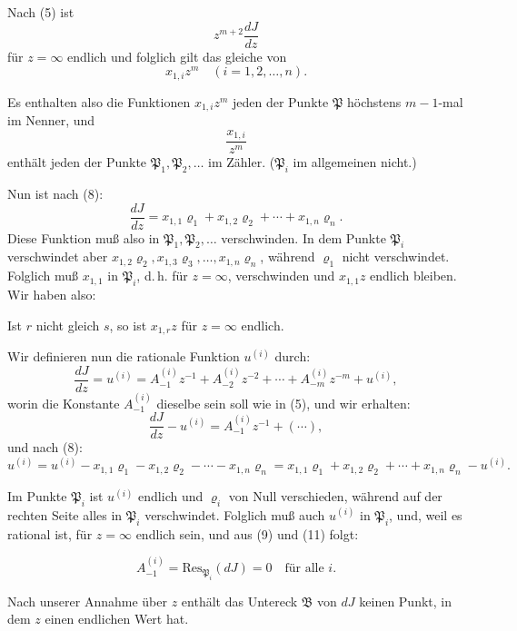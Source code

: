 \documentclass[12pt,a4paper]{article}
\begin{document}
Nach (5) ist
\[
z^{m+2} \frac{dJ}{dz}
\]
für $z = \infty$ endlich und folglich gilt das gleiche von
\begin{equation}\label{eq:201-10}
x_{1,i} z^m \quad (i = 1, 2, \ldots, n).
\end{equation}

Es enthalten also die Funktionen $x_{1,i} z^m$ jeden der Punkte $\mathfrak{P}$ höchstens $m-1$-mal im Nenner, und
\[
\frac{x_{1,i}}{z^m}
\]
enthält jeden der Punkte $\mathfrak{P}_1, \mathfrak{P}_2, \ldots$ im Zähler. ($\mathfrak{P}_i$ im allgemeinen nicht.)

Nun ist nach (8):
\[
\frac{dJ}{dz} = x_{1,1} \varrho_1 + x_{1,2} \varrho_2 + \cdots + x_{1,n} \varrho_n.
\]
Diese Funktion muß also in $\mathfrak{P}_1, \mathfrak{P}_2, \ldots$ verschwinden. In dem Punkte $\mathfrak{P}_i$ verschwindet aber $x_{1,2} \varrho_2, x_{1,3} \varrho_3, \ldots, x_{1,n} \varrho_n$, während $\varrho_1$ nicht verschwindet. Folglich muß $x_{1,1}$ in $\mathfrak{P}_i$, d.\,h. für $z = \infty$, verschwinden und $x_{1,1} z$ endlich bleiben. Wir haben also:

Ist $r$ nicht gleich $s$, so ist $x_{1,r} z$ für $z = \infty$ endlich.

Wir definieren nun die rationale Funktion $u^{(i)}$ durch:
\[
\frac{dJ}{dz} = u^{(i)} = A_{-1}^{(i)} z^{-1} + A_{-2}^{(i)} z^{-2} + \cdots + A_{-m}^{(i)} z^{-m} + u^{(i)},
\]
worin die Konstante $A_{-1}^{(i)}$ dieselbe sein soll wie in (5), und wir erhalten:
\begin{equation}\label{eq:201-12}
\frac{dJ}{dz} - u^{(i)} = A_{-1}^{(i)} z^{-1} + (\cdots),
\end{equation}
und nach (8):
\[
u^{(i)} = u^{(i)} - x_{1,1} \varrho_1 - x_{1,2} \varrho_2 - \cdots - x_{1,n} \varrho_n = x_{1,1} \varrho_1 + x_{1,2} \varrho_2 + \cdots + x_{1,n} \varrho_n - u^{(i)}.
\]

Im Punkte $\mathfrak{P}_i$ ist $u^{(i)}$ endlich und $\varrho_i$ von Null verschieden, während auf der rechten Seite alles in $\mathfrak{P}_i$ verschwindet. Folglich muß auch $u^{(i)}$ in $\mathfrak{P}_i$, und, weil es rational ist, für $z = \infty$ endlich sein, und aus (9) und (11) folgt:

\begin{equation}\label{eq:201-13}
A_{-1}^{(i)} = \text{Res}_{\mathfrak{P}_i}(dJ) = 0 \quad \text{für alle } i.
\end{equation}

Nach unserer Annahme über $z$ enthält das Untereck $\mathfrak{B}$ von $dJ$ keinen Punkt, in dem $z$ einen endlichen Wert hat.
\end{document}
